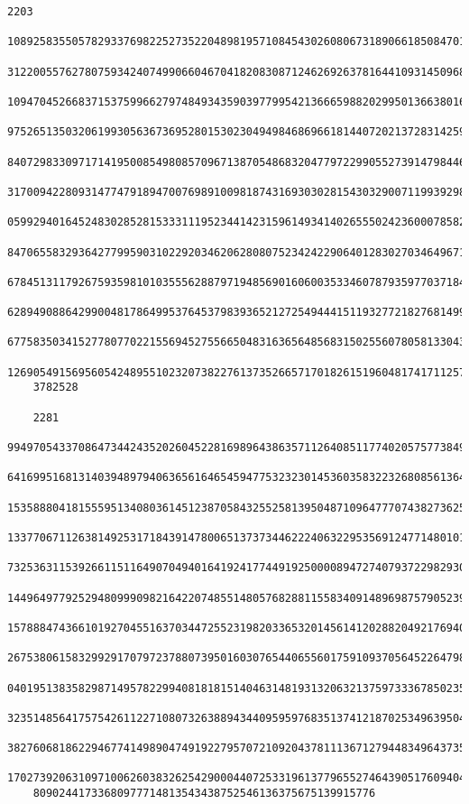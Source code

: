 \documentclass[11pt,twoside,openany]{memoir}
\begin{document}
\begin{tcolorbox}
\begin{Verbatim}[fontsize=\tiny]
    2203
    10892583550578293376982252735220489819571084543026080673189066185084701552986169962919409618589013795461826855
    31220055762780759342407499066046704182083087124626926378164410931450968826355205573671671624202686633360807123
    10947045266837153759966279748493435903977995421366659882029950136638016461908026040323522955673055416399230300
    97526513503206199305636736952801530230494984686966181440720213728314259637014605056063781192458413865526001453
    84072983309717141950085498085709671387054868320477972299055273914798446936214147860706887052107312380067072602
    31700942280931477479189470076989100981874316930302815430329007119939298429294028385221780016662922915711026408
    05992940164524830285281533311195234414231596149341402655502423600078582159367984895007271963475163860442417219
    84706558329364277995903102292034620628080752342422906401283027034649671445569324281946859622177566643375489715
    67845131179267593598101035556288797194856901606003533460787935977037184650765997060161699831198387815042076330
    62894908864299004817864995376453798393652127254944415119327721827681499436598490074572469838615582651448231913
    67758350341527780770221556945275566504831636564856831502556078058133043400055653540413313266034639355202834006
    12690549156956054248955102320738227613735266571701826151960481741711257652641053532399150005874999624758083445
    3782528
    
    2281
    99497054337086473442435202604522816989643863571126408511774020575773849326355529178686629498151336416502516645
    64169951681314039489794063656164654594775323230145360358322326808561364723376808164572766903739438569652282030
    15358880418155595134080361451238705843255258139504871096477707438273625718228705676430401847231158256455903863
    13377067112638149253171843914780065137373446222406322953569124771480101363180966448099882292453452395428270875
    73253631153926611511649070494016419241774491925000089472740793722982930057825342788449435845994953523181978136
    14496497792529480999098216422074855148057682881155834091489698757905239618787531249726811799442346410169600118
    15788847436610192704551637034472552319820336532014561412028820492176940418377074274389149924303484945446105121
    26753806158329929170797237880739501603076544065560175910937056452264798915612180427301226601178345110223008138
    04019513835829871495782299408181815140463148193132063213759733367850235654431013056331276102305495886556059513
    32351485641757542611227108073263889434409595976835137412187025349639504404061654653755349162680629290551644153
    38276068186229467741498904749192279570721092043781113671279448349643735598083346332959283814015780318205519782
    17027392063109710062603832625429000440725331961377965527464390517609404300823756411501298179601830280810109787
    80902441733680977714813543438752546136375675139915776
    

\end{Verbatim}
\end{tcolorbox}
\end{document}
